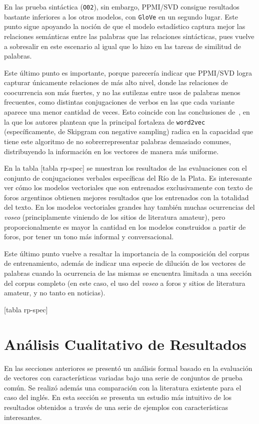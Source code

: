En las prueba sintáctica (\texttt{O02}), sin embargo, PPMI/SVD consigue resultados bastante
inferiores a los otros modelos, con \texttt{GloVe} en un segundo lugar. Este punto sigue apoyando la
noción de que el modelo estadístico captura mejor las relaciones semánticas entre las palabras que
las relaciones sintácticas, pues vuelve a sobresalir en este escenario al igual que lo hizo en las
tareas de similitud de palabras.

Este último punto es importante, porque parecería indicar que PPMI/SVD logra capturar únicamente
relaciones de más alto nivel, donde las relaciones de coocurrencia son más fuertes, y no las
sutilezas entre usos de palabras menos frecuentes, como distintas conjugaciones de verbos en las que
cada variante aparece una menor cantidad de veces. Esto coincide con las conclusiones
de~\cite{Levy2014a}, en la que los autores plantean que la principal fortaleza de \texttt{word2vec}
(específicamente, de Skipgram con negative sampling) radica en la capacidad que tiene este algoritmo
de no sobrerrepresentar palabras demasiado comunes, distribuyendo la información en los vectores de
manera más uniforme.


En la tabla [tabla rp-spec] se muestran los resultados de las evaluaciones con el conjunto de
conjugaciones verbales específicas del Río de la Plata. Es interesante ver cómo los modelos
vectoriales que son entrenados exclusivamente con texto de foros argentinos obtienen mejores
resultados que los entrenados con la totalidad del texto. En los modelos vectoriales grandes hay
también muchas ocurrencias del \textit{voseo} (principlamente viniendo de los sitios de literatura
amateur), pero proporcionalmente es mayor la cantidad en los modelos construidos a partir de foros,
por tener un tono más informal y conversacional.

Este último punto vuelve a resaltar la importancia de la composición del corpus de entrenamiento,
además de indicar una especie de dilución de los vectores de palabras cuando la ocurrencia de las
mismas se encuentra limitada a una sección del corpus completo (en este caso, el uso del
\textit{voseo} a foros y sitios de literatura amateur, y no tanto en noticias).

[tabla rp-spec]


\section{Análisis Cualitativo de Resultados}

En las secciones anteriores se presentó un análisis formal basado en la evaluación de vectores con
características variadas bajo una serie de conjuntos de prueba común. Se realizó además
una comparación con la literatura existente para el caso del inglés. En esta sección se presenta
un estudio más intuitivo de los resultados obtenidos a través de una serie de ejemplos con
características interesantes.

